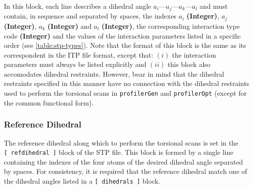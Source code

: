 \documentclass[10pt,a4paper,openany]{memoir}
\numberwithin{equation}{section}
\newcommand{\profileropt}[0]{\texttt{profilerOpt}}
\newcommand{\profilergen}[0]{\texttt{profilerGen}}
\begin{document}
In this block, each line describes a dihedral angle
$a_i$---$a_j$---$a_k$---$a_l$ and must contain, in sequence and
separated by spaces, the indexes $a_i$ \textbf{(Integer)}, $a_j$
\textbf{(Integer)}, $a_k$ \textbf{(Integer)} and $a_l$
\textbf{(Integer)}, the corresponding interaction type code
\textbf{(Integer)} and the values of the interaction parameters listed
in a specific order (see \autoref{table:stp-types}). Note that the
format of this block is the same as its correspondent in the ITP file
format, except that: $(i)$ the interaction parameters must always be
listed explicitly and $(ii)$ this block also accomodates dihedral
restraints.
However, bear in mind that the dihedral restraints specified in this
manner have no connection with the dihedral restraints used to perform
the torsional scans in \profilergen{} and \profileropt{} (except for
the common functional form).


\subsubsection{Reference Dihedral}
\label{sec:stp-ref_dihedral}

The reference dihedral along which to perform the torsional scans is
set in the \texttt{[~refdihedral~]} block of the STP file. This block
is formed by a single line containing the indexes of the four atoms of
the desired dihedral angle separated by spaces. For consistency, it is
required that the reference dihedral match one of the dihedral angles
listed in a \texttt{[~dihedrals~]} block.
\end{document}
